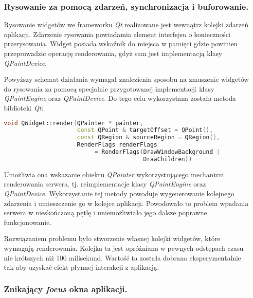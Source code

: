 \subsubsection{Rysowanie za pomocą zdarzeń, synchronizacja i buforowanie.}
\label{rendering_events}

Rysowanie widgetów we frameworku \emph{Qt} realizowane jest wewnątrz kolejki zdarzeń aplikacji. Zdarzenie rysowania powiadamia element interfejsu o konieczności przerysowania. Widget posiada wskaźnik do miejsca w pamięci gdzie powinien przeprowadzic operację renderowania, gdyż sam jest implementacją klasy \emph{QPaintDevice}. 

Powyższy schemat działania wymagał znalezienia sposobu na zmuszenie widgetów do rysowania za pomocą specjalnie przygotowanej implementacji klasy \emph{QPaintEngine} oraz \emph{QPaintDevice}. Do tego celu wykorzystana została metoda biblioteki \emph{Qt}:

\begin{lstlisting}[language=C++,numbers=none]
void QWidget::render(QPainter * painter, 
                     const QPoint & targetOffset = QPoint(), 
                     const QRegion & sourceRegion = QRegion(), 
                     RenderFlags renderFlags 
                          = RenderFlags(DrawWindowBackground | 
                                        DrawChildren))
\end{lstlisting}

Umożliwia ona wskazanie obiektu \emph{QPainter} wykorzystującego mechanizm renderowania serwera, tj. reimplementacje klasy \emph{QPaintEngine} oraz \emph{QPaintDevice}. Wykorzystanie tej metody powoduje wygenerowanie kolejnego zdarzenia i umieszczenie go w kolejce aplikacji. Powodowało to problem wpadania serwera w nieskończoną pętlę i uniemożliwiało jego dalsze poprawne funkcjonowanie. 

Rozwiązaniem problemu było stworzenie własnej kolejki widgetów, które wymagają renderowania. Kolejka ta jest opróżniana w pewnych odstępach czasu nie krótszych niż 100 milisekund. Wartość ta została dobrana eksperymentalnie tak aby uzyskać efekt płynnej interakcji z aplikacją.

\subsubsection{Znikający \emph{focus} okna aplikacji.}
\label{problems_focus}

